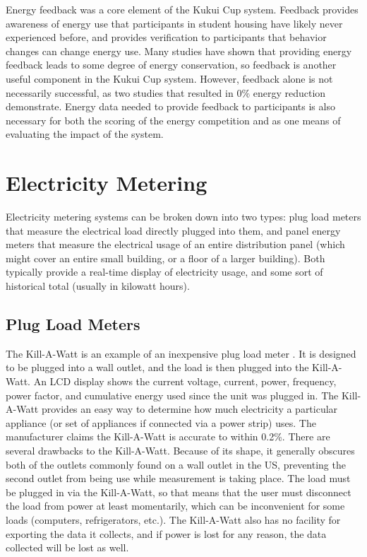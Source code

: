 Energy feedback was a core element of the Kukui Cup system. Feedback provides awareness of energy use that participants in student housing have likely never experienced before, and provides verification to participants that behavior changes can change energy use. Many studies have shown that providing energy feedback leads to some degree of energy conservation, so feedback is another useful component in the Kukui Cup system. However, feedback alone is not necessarily successful, as two studies that resulted in 0\% energy reduction demonstrate. Energy data needed to provide feedback to participants is also necessary for both the scoring of the energy competition and as one means of evaluating the impact of the system.


\section{Electricity Metering}

Electricity metering systems can be broken down into two types: plug load meters that measure the electrical load directly plugged into them, and panel energy meters that measure the electrical usage of an entire distribution panel (which might cover an entire small building, or a floor of a larger building). Both typically provide a real-time display of electricity usage, and some sort of historical total (usually in kilowatt hours).

\subsection{Plug Load Meters}
\label{sec:plug-load-meters}

The Kill-A-Watt is an example of an inexpensive plug load meter \cite{kill-a-watt}. It is designed to be plugged into a wall outlet, and the load is then plugged into the Kill-A-Watt. An LCD display shows the current voltage, current, power, frequency, power factor, and cumulative energy used since the unit was plugged in. The Kill-A-Watt provides an easy way to determine how much electricity a particular appliance (or set of appliances if connected via a power strip) uses. The manufacturer claims the Kill-A-Watt is accurate to within 0.2\%. There are several drawbacks to the Kill-A-Watt. Because of its shape, it generally obscures both of the outlets commonly found on a wall outlet in the US, preventing the second outlet from being use while measurement is taking place. The load must be plugged in via the Kill-A-Watt, so that means that the user must disconnect the load from power at least momentarily, which can be inconvenient for some loads (computers, refrigerators, etc.). The Kill-A-Watt also has no facility for exporting the data it collects, and if power is lost for any reason, the data collected will be lost as well.

